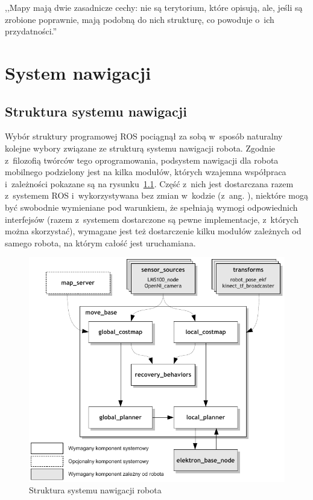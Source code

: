 

\begin{savequote}[70mm]
,,Mapy mają dwie zasadnicze cechy: nie są terytorium, które opisują, ale, jeśli
są zrobione poprawnie, mają podobną do nich strukturę, co powoduje o~ich
przydatności.''
\end{savequote}


\chapter{System nawigacji}
\label{chap:mapa}

\section{Struktura systemu nawigacji}

Wybór struktury programowej ROS pociągnął za sobą w~sposób naturalny kolejne
wybory związane ze strukturą systemu nawigacji robota. Zgodnie z~filozofią
twórców tego oprogramowania, podsystem nawigacji dla robota mobilnego podzielony
jest na kilka modułów, których wzajemna współpraca i~zależności pokazane są na
rysunku~\ref{fig:diag_move_base}. Część z~nich jest dostarczana razem z~systemem
ROS i~wykorzystywana bez zmian w~kodzie (z~ang. ), niektóre mogą być
swobodnie wymieniane pod warunkiem, że spełniają wymogi odpowiednich interfejsów
(razem z~systemem dostarczone są pewne implementacje, z~których można
skorzystać), wymagane jest też dostarczenie kilku modułów zależnych od samego
robota, na którym całość jest uruchamiana.

\begin{figure}[h!]
\centering
\includegraphics{../img/diag_move_base}
\caption{Struktura systemu nawigacji robota}
\label{fig:diag_move_base}
\end{figure}

